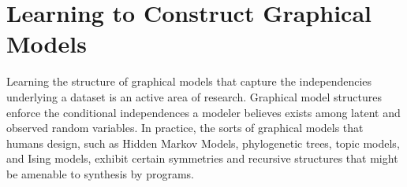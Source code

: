 \documentclass{article} %
\begin{document}
\section{Learning to Construct Graphical Models}

Learning the structure of graphical models that capture the independencies underlying a dataset is an active area of research\cite{adams-wallach-ghahramani-2010a}\cite{ISI:000240797500002}\cite{ISI:000178037200004}\cite{DBLP:journals/corr/abs-1302-6815}. Graphical model structures enforce the conditional independences a modeler believes exists among latent and observed random variables\cite{DBLP:books/daglib/0066829}.
In practice, the sorts of graphical models that humans design, such as Hidden Markov Models, phylogenetic trees, topic models, and Ising models, exhibit certain symmetries and recursive structures that might be amenable to synthesis by programs.
\end{document}
